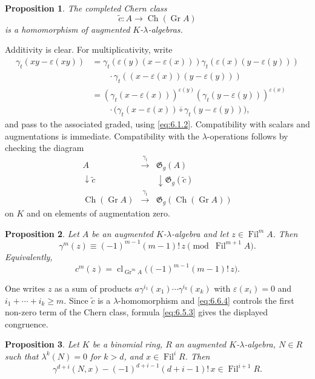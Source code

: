 \documentclass[13pt]{extarticle}
\newcommand{\Go}{\mathfrak G}
\newcommand{\Fil}{\operatorname{Fil}}
\newcommand{\Gr}{\operatorname{Gr}}
\newcommand{\cl}{\operatorname{cl}}
\newcommand{\Ch}{\operatorname{Ch}}
\newtheorem*{proposition}{Proposition}
\begin{document}
\begin{proposition}\label{prop:6.8}
The completed Chern class
\[
\widetilde c:A\longrightarrow \Ch(\Gr A)
\]
is a homomorphism of augmented $K$-$\lambda$-algebras.
\end{proposition}

Additivity is clear. For multiplicativity, write
\begin{align*}
\gamma_t(xy-\varepsilon(xy))&=\gamma_t(\varepsilon(y)(x-\varepsilon(x)))\gamma_t(\varepsilon(x)(y-\varepsilon(y)))\\
&\qquad\cdot\gamma_t((x-\varepsilon(x))(y-\varepsilon(y)))\\
&=(\gamma_t(x-\varepsilon(x)))^{\varepsilon(y)}(\gamma_t(y-\varepsilon(y)))^{\varepsilon(x)}\\
&\qquad\cdot\bigl(\gamma_t(x-\varepsilon(x))\overline{\circ}\gamma_t(y-\varepsilon(y))\bigr),
\end{align*}
and pass to the associated graded, using \eqref{eq:6.1.2}. Compatibility with scalars and augmentations is immediate. Compatibility with the $\lambda$-operations follows by checking the diagram
\[
\begin{array}{ccc}
A&\xrightarrow{\gamma_t}&\Go_g(A)\\
\downarrow\widetilde c&&\downarrow\Go_g(\widetilde c)\\
\Ch(\Gr A)&\xrightarrow{\gamma_t}&\Go_g(\Ch(\Gr A))
\end{array}
\]
on $K$ and on elements of augmentation zero.

\begin{proposition}\label{prop:6.9}
Let $A$ be an augmented $K$-$\lambda$-algebra and let $z\in\Fil^mA$. Then
\begin{equation}\label{eq:6.9.1}
\gamma^m(z)\equiv(-1)^{m-1}(m-1)!\,z\pmod{\Fil^{m+1}A}.
\end{equation}
Equivalently,
\[
c^m(z)=\cl_{\Gr^mA}\bigl((-1)^{m-1}(m-1)!\,z\bigr).
\]
\end{proposition}

One writes $z$ as a sum of products $a\gamma^{i_1}(x_1)\cdots\gamma^{i_k}(x_k)$ with $\varepsilon(x_i)=0$ and $i_1+\cdots+i_k\geq m$. Since $\widetilde c$ is a $\lambda$-homomorphism and \eqref{eq:6.6.4} controls the first non-zero term of the Chern class, formula \eqref{eq:6.5.3} gives the displayed congruence.

\begin{proposition}\label{prop:6.10}
Let $K$ be a binomial ring, $R$ an augmented $K$-$\lambda$-algebra, $N\in R$ such that $\lambda^k(N)=0$ for $k>d$, and $x\in\Fil^iR$. Then
\begin{equation}\label{eq:6.10}
\gamma^{d+i}(N,x)-(-1)^{d+i-1}(d+i-1)!\,x\in\Fil^{i+1}R.
\end{equation}
\end{proposition}
\end{document}
